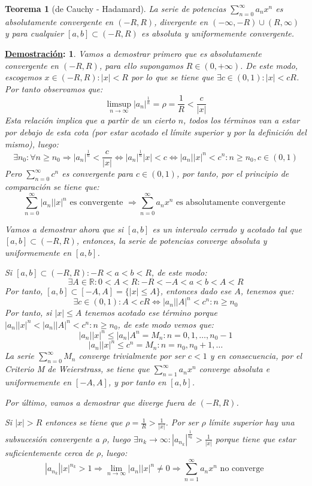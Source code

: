 \documentclass[10pt,a4paper,openright]{book}
\theoremstyle{break}
\newtheorem*{theo}{Teorema}
\newtheorem*{demo}{\underline{Demostración}:}
\begin{document}
\begin{theo}[de Cauchy - Hadamard]
La serie de potencias $\sum_{n= 0}^{\infty} a_n x^n$ es absolutamente convergente en $(-R , R)$, divergente en $(-\infty, -R)\cup (R,\infty)$ y   para cualquier $[a,b]\subset (-R , R)$ es absoluta y uniformemente convergente.
\end{theo}
\begin{demo}
Vamos a demostrar primero que es absolutamente convergente en $(-R, R)$, para ello supongamos $R \in (0, +\infty)$. De este modo, escogemos $x \in (-R, R) : |x| < R$ por lo que se tiene que $\exists c \in (0,1) : |x| < cR$. Por tanto observamos que:
$$\limsup_{n\rightarrow\infty} |a_n|^{\frac{1}{n}} = \rho = \frac{1}{R} < \frac{c}{|x|}$$
Esta relación implica que a partir de un cierto $n$, todos los términos van a estar por debajo de esta cota (por estar acotado el límite superior y por la definición del mismo), luego:
$$\exists n_0 : \forall n \geq n_0 \Rightarrow |a_n|^{\frac{1}{n}} < \frac{c}{|x|} \Leftrightarrow  |a_n|^{\frac{1}{n}}  |x| < c \Leftrightarrow |a_n| |x|^n < c^n : n \geq n_0 , c \in (0,1)$$
Pero $\sum_{n = 0}^{\infty} c^n$ es convergente para $c \in (0,1)$, por tanto, por el principio de comparación se tiene que:
$$\sum_{n=0}^{\infty} |a_n||x|^n \mbox{ es convergente } \Rightarrow \sum_{n=0}^{\infty} a_n x^n \mbox{ es absolutamente convergente }$$

Vamos a demostrar ahora que si $[a,b]$ es un intervalo cerrado y acotado tal que $[a,b] \subset (-R , R)$, entonces, la serie de potencias converge absoluta y uniformemente en $[a,b]$.

Si $[a,b] \subset (-R , R) : - R < a < b < R$, de este modo:
$$\exists A \in \mathbb R: 0 < A < R : - R < - A < a < b < A < R $$
Por tanto, $[a,b] \subset [-A, A] = \{|x| \leq A\}$, entonces dado ese $A$, tenemos que:
$$\exists c \in (0,1) : A < cR \Leftrightarrow |a_n| |A|^n < c^n : n \geq n_0$$
Por tanto, si $|x| \leq A$ tenemos acotado ese término porque $|a_n| |x|^n  < |a_n| |A|^n  < c^n : n \geq n_0$, de este modo vemos que:
$$|a_n||x|^n \leq |a_n| A^n = M_n : n = 0,1, \ldots, n_0 - 1$$
$$|a_n||x|^n \leq c^n = M_n : n = n_0, n_0 + 1, \ldots$$
La serie $\sum_{n=0}^{\infty} M_n$ converge trivialmente por ser $c < 1$ y en consecuencia, por el Criterio M de Weierstrass, se tiene que $\sum_{n=1}^{\infty} a_n x^n$ converge absoluta e uniformemente en $[-A, A]$, y por tanto en $[a,b]$.

Por último, vamos a demostrar que diverge fuera de $(-R,R)$.

Si $|x| > R$ entonces se tiene que $\rho = \frac{1}{R} > \frac{1}{|x|}$. Por ser $\rho$ límite superior hay una subsucesión convergente a $\rho$, luego $\exists n_k \to \infty : |a_{n_k}|^\frac{1}{n_k} > \frac{1}{|x|}$ porque tiene que estar suficientemente cerca de $\rho$, luego:
$$|a_{n_k}| |x|^{n_k} > 1\Rightarrow \lim_{n \to \infty} |a_n||x|^n \neq 0 \Rightarrow \sum_{n=1}^{\infty} a_n x^n \mbox{ no converge }$$
\end{demo}
\end{document}
